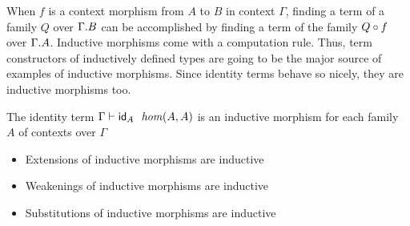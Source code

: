 When $f$ is a context morphism from $A$ to $B$ in context $\Gamma$, 
finding a term of a family $Q$ over $\ctxext{\Gamma}{B}$ can be accomplished
by finding a term of the family $\jcomp{A}{f}{Q}$ over $\ctxext{\Gamma}{A}$.
Inductive morphisms come with a computation rule. Thus, term
constructors of inductively defined types are going to be the major source of
examples of inductive morphisms. Since identity terms behave
so nicely, they are inductive morphisms too.

\begin{lem}
The identity term
$\jhom{\Gamma}{A}{A}{\idtm{A}}$ is an inductive morphism
for each family $A$ of contexts over $\Gamma$
\end{lem}

\begin{itemize}
\item Extensions of inductive morphisms are inductive
\item Weakenings of inductive morphisms are inductive
\item Substitutions of inductive morphisms are inductive
\end{itemize}

